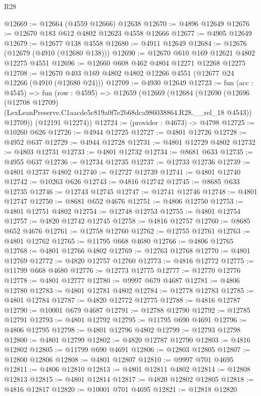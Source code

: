 \begin{lexlean}{R28}
\begin{coremodule}
@12669 := @12664 (@4559 @12666) @12638
@12670 := @4896 @12649
@12676 := @12670 @183 @612 @4802 @12623 @4558 @12666
@12677 := @4905 @12649
@12679 := @12677 @138 @4558
@12680 := @4911 @12649
@12684 := @12676 (@12679 (@4910 (@12680 @138)))
@12690 := @12670 @610 @169 @12621 @4802 @12275 @4551
@12696 := @12660 @608 @462 @4804 @12271 @12268 @12275
@12708 := @12670 @403 @169 @4802 @4802 @12266 @4551 (@12677 @24 @12266 (@4910 (@12680 @24)))
@12709 := @4930 @12649
@12723 := fun (acc : @4545) =>
  fun (row : @4595) =>
  @12659
    (@12669
      (@12684
        (@12690
          (@12696
            (@12708 @12709)
            (LexLeanPreserve.C1aacde5c819a0f7e2b68dca986038864.R28.__rel_18 @4543))
          @12709))
      (@12191 @12274))
@12724 := (provider : @4673) -> @4798
@12725 := @10260 @626
@12726 := @4944 @12725
@12727 := @4801 @12726
@12728 := @4952 @637
@12729 := @4944 @12728
@12731 := @4801 @12729 @4802
@12732 := @4803 @12731
@12733 := @4801 @12732
@12734 := @8681 @633
@12735 := @4955 @637
@12736 := @12734 @12735
@12737 := @12733 @12736
@12739 := @4801 @12737 @4802
@12740 := @12727 @12739
@12741 := @4801 @12740
@12742 := @10263 @626
@12743 := @4816 @12742
@12745 := @8685 @633 @12735
@12746 := @12743 @12745
@12747 := @12741 @12746
@12748 := @4801 @12747
@12750 := @8681 @652 @4676
@12751 := @4806 @12750
@12753 := @4801 @12751 @4802
@12754 := @12748 @12753
@12755 := @4801 @12754
@12757 := @4820 @12742 @12745
@12758 := @4816 @12757
@12760 := @8685 @652 @4676
@12761 := @12758 @12760
@12762 := @12755 @12761
@12763 := @4801 @12762
@12765 := @11795 @668 @4680
@12766 := @4806 @12765
@12768 := @4801 @12766 @4802
@12769 := @12763 @12768
@12770 := @4801 @12769
@12772 := @4820 @12757 @12760
@12773 := @4816 @12772
@12775 := @11799 @668 @4680
@12776 := @12773 @12775
@12777 := @12770 @12776
@12778 := @4801 @12777
@12780 := @9997 @679 @4687
@12781 := @4806 @12780
@12783 := @4801 @12781 @4802
@12784 := @12778 @12783
@12785 := @4801 @12784
@12787 := @4820 @12772 @12775
@12788 := @4816 @12787
@12790 := @10001 @679 @4687
@12791 := @12788 @12790
@12792 := @12785 @12791
@12793 := @4801 @12792
@12795 := @11795 @690 @4691
@12796 := @4806 @12795
@12798 := @4801 @12796 @4802
@12799 := @12793 @12798
@12800 := @4801 @12799
@12802 := @4820 @12787 @12790
@12803 := @4816 @12802
@12805 := @11799 @690 @4691
@12806 := @12803 @12805
@12807 := @12800 @12806
@12808 := @4801 @12807
@12810 := @9997 @701 @4695
@12811 := @4806 @12810
@12813 := @4801 @12811 @4802
@12814 := @12808 @12813
@12815 := @4801 @12814
@12817 := @4820 @12802 @12805
@12818 := @4816 @12817
@12820 := @10001 @701 @4695
@12821 := @12818 @12820

\end{coremodule}
\end{lexlean}
